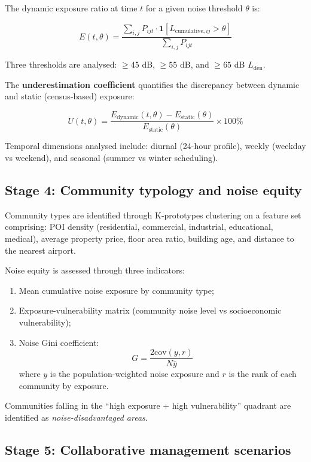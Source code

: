\documentclass[review,12pt]{elsarticle}
\begin{document}
The dynamic exposure ratio at time $t$ for a given noise threshold $\theta$ is:

\[
E(t, \theta) = \frac{\sum_{i,j} P_{ijt} \cdot \mathbf{1}[L_{\text{cumulative},ij} > \theta]}{\sum_{i,j} P_{ijt}}
\]

Three thresholds are analysed: $\geq 45$ dB, $\geq 55$ dB, and $\geq 65$ dB $L_{\text{den}}$.

The \textbf{underestimation coefficient} quantifies the discrepancy between dynamic and static (census-based) exposure:

\[
U(t, \theta) = \frac{E_{\text{dynamic}}(t, \theta) - E_{\text{static}}(\theta)}{E_{\text{static}}(\theta)} \times 100\%
\]

Temporal dimensions analysed include: diurnal (24-hour profile), weekly (weekday vs weekend), and seasonal (summer vs winter scheduling).

\subsection{Stage 4: Community typology and noise equity}

Community types are identified through K-prototypes clustering on a feature set comprising: POI density (residential, commercial, industrial, educational, medical), average property price, floor area ratio, building age, and distance to the nearest airport.

Noise equity is assessed through three indicators:
\begin{enumerate}[noitemsep]
    \item Mean cumulative noise exposure by community type;
    \item Exposure-vulnerability matrix (community noise level vs socioeconomic vulnerability);
    \item Noise Gini coefficient:
    \[
    G = \frac{2 \text{cov}(y, r)}{N \bar{y}}
    \]
    where $y$ is the population-weighted noise exposure and $r$ is the rank of each community by exposure.
\end{enumerate}

Communities falling in the ``high exposure + high vulnerability'' quadrant are identified as \textit{noise-disadvantaged areas}.

\subsection{Stage 5: Collaborative management scenarios}
\end{document}
